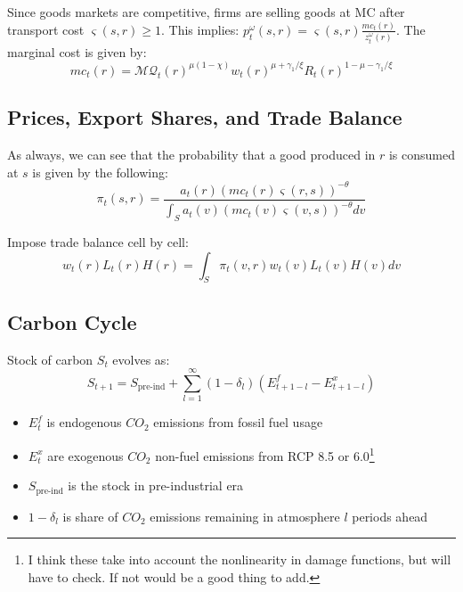 \documentclass[12pt]{amsart}
\begin{document}
Since goods markets are competitive, firms are selling goods at MC after transport cost $\varsigma(s,r)\geq 1$. This implies: $p_t^\omega(s,r) = \varsigma(s,r) \frac{mc_t(r)}{z_t^\omega(r)}$. The marginal cost is given by:
\begin{equation*}
    mc_t(r) = \mathcal{M} \mathcal{Q}_t(r)^{\mu (1-\chi)} w_t(r)^{\mu + \gamma_1 / \xi} R_t(r)^{1-\mu-\gamma_1 / \xi}
\end{equation*}

\subsection{Prices, Export Shares, and Trade Balance}

As always, we can see that the probability that a good produced in $r$ is consumed at $s$ is given by the following:
\begin{equation}
    \pi_t(s,r) = \frac{a_t(r) \left( mc_t(r) \varsigma(r,s) \right)^{-\theta}}{\int_S a_t(v) \left(mc_t(v) \varsigma(v, s)\right)^{-\theta} dv} \label{eq:prob_trade}
\end{equation}



Impose trade balance cell by cell:
\begin{equation}
    w_t(r) L_t(r) H(r) = \int_S \pi_t(v, r) w_t(v) L_t(v) H(v) dv \label{eq:trade_balance}
\end{equation}

\subsection{Carbon Cycle}

Stock of carbon $S_t$ evolves as:
\begin{equation}
    S_{t+1} = S_\text{pre-ind} + \sum_{l=1}^\infty (1-\delta_l) \left( E_{t+1-l}^f - E_{t+1-l}^x \right) \label{eq:carbon_stock}
\end{equation}
\begin{itemize}
    \item $E_t^f$ is endogenous $CO_2$ emissions from fossil fuel usage
    \item $E_t^x$ are exogenous $CO_2$ non-fuel emissions from RCP 8.5 or 6.0\footnote{I think these take into account the nonlinearity in damage functions, but will have to check. If not would be a good thing to add.}
    \item $S_\text{pre-ind}$ is the stock in pre-industrial era
    \item $1-\delta_l$ is share of $CO_2$ emissions remaining in atmosphere $l$ periods ahead
\end{itemize}
\end{document}
